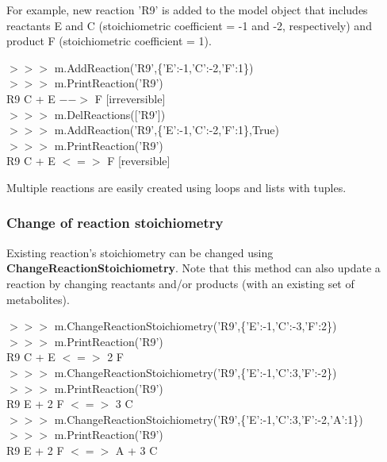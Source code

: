For example, new reaction 'R9' is added to the model object that includes reactants E and C (stoichiometric coefficient = -1 and -2, respectively) and product F (stoichiometric coefficient = 1). 

\begin{framed}
$>>>$ m.AddReaction('R9',\{'E':-1,'C':-2,'F':1\})\\
$>>>$ m.PrintReaction('R9')\\
R9  C + E $-->$ F [irreversible]\\ 

$>>>$ m.DelReactions(['R9'])\\
$>>>$ m.AddReaction('R9',\{'E':-1,'C':-2,'F':1\},True)\\
$>>>$ m.PrintReaction('R9')\\
R9  C + E $<=>$ F [reversible]
\end{framed}

Multiple reactions are easily created using loops and lists with tuples.


\subsubsection{Change of reaction stoichiometry}
Existing reaction's stoichiometry can be changed using \textbf{ChangeReactionStoichiometry}. Note that this method can also update a reaction by changing reactants and/or products (with an existing set of metabolites).

\begin{framed}
$>>>$ m.ChangeReactionStoichiometry('R9',\{'E':-1,'C':-3,'F':2\})\\
$>>>$ m.PrintReaction('R9')\\
R9  C + E $<=>$ 2 F\\

$>>>$ m.ChangeReactionStoichiometry('R9',\{'E':-1,'C':3,'F':-2\})\\
$>>>$ m.PrintReaction('R9')\\
R9 \space E + 2 F $<=>$ 3 C\\

$>>>$ m.ChangeReactionStoichiometry('R9',\{'E':-1,'C':3,'F':-2,'A':1\})\\
$>>>$ m.PrintReaction('R9')\\
R9 \space E + 2 F $<=>$ A + 3 C
\end{framed}


